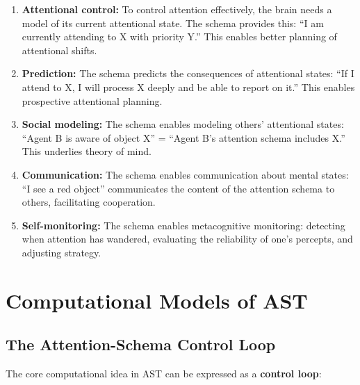 \documentclass[11pt,a4paper]{report}
\begin{document}
\begin{predbox}
\begin{enumerate}[leftmargin=1.5em]
  \item \textbf{Attentional control:} To control attention effectively, the brain needs a model of its current attentional state. The schema provides this: ``I am currently attending to X with priority Y.'' This enables better planning of attentional shifts.
  \item \textbf{Prediction:} The schema predicts the consequences of attentional states: ``If I attend to X, I will process X deeply and be able to report on it.'' This enables prospective attentional planning.
  \item \textbf{Social modeling:} The schema enables modeling others' attentional states: ``Agent B is aware of object X'' = ``Agent B's attention schema includes X.'' This underlies theory of mind.
  \item \textbf{Communication:} The schema enables communication about mental states: ``I see a red object'' communicates the content of the attention schema to others, facilitating cooperation.
  \item \textbf{Self-monitoring:} The schema enables metacognitive monitoring: detecting when attention has wandered, evaluating the reliability of one's percepts, and adjusting strategy.
\end{enumerate}
\end{predbox}


\chapter{Computational Models of AST}

\section{The Attention-Schema Control Loop}

The core computational idea in AST can be expressed as a \textbf{control loop}:
\end{document}
